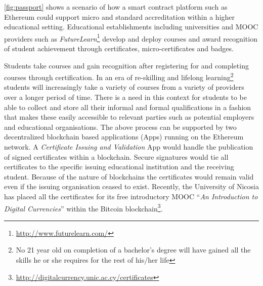 \autoref{fig:passport} shows a scenario of how a smart contract platform such as Ethereum could support micro and standard accreditation within a higher educational setting.
Educational establishments including universities and MOOC providers such as \emph{FutureLearn}\footnote{\url{http://www.futurelearn.com/}} develop and deploy courses and award recognition of student achievement through certificates, micro-certificates and badges. 

Students take courses and gain recognition after registering for and completing courses through certification. 
In an era of re-skilling and lifelong learning\footnote{No 21 year old on completion of a bachelor's degree will have gained all the skills he or she requires for the rest of his/her life} students will increasingly take a variety of courses from a variety of providers over a longer period of time. 
There is a need in this context for students to be able to collect and store all their informal and formal qualifications in a fashion that makes these easily accessible to relevant parties such as potential employers and educational organisations. 
The above process can be supported by two decentralized blockchain based applications (\DJ{}Apps) running on the Ethereum network. 
A \emph{Certificate Issuing and Validation} \DJ{}App would handle the publication of signed certificates within a blockchain. 
Secure signatures would tie all certificates to the specific issuing educational institution and the receiving student. 
Because of the nature of blockchains the certificates would remain valid even if the issuing organisation ceased to exist. 
Recently, the University of Nicosia has placed all the certificates for its free introductory MOOC ``\textit{An Introduction to Digital Currencies}'' within the Bitcoin blockchain\footnote{\url{http://digitalcurrency.unic.ac.cy/certificates}}.

